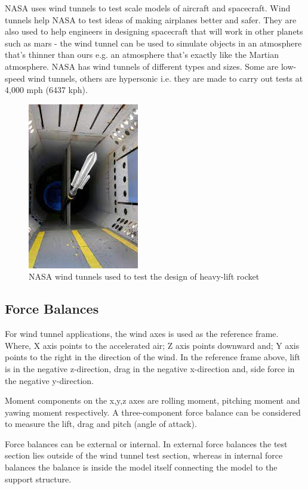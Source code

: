 NASA uses wind tunnels to test scale models of aircraft and spacecraft. Wind tunnels help NASA to test ideas of making airplanes better and safer. They are also used to help engineers in designing spacecraft that will work in other planets such as mars - the wind tunnel can be used to simulate objects in an atmosphere that's thinner than ours e.g. an atmosphere that's exactly like the Martian atmosphere. NASA has wind tunnels of different types and sizes. Some are low-speed wind tunnels, others are hypersonic i.e. they are made to carry out tests at 4,000 mph (6437 kph).
\begin{center}
    \begin{figure}[!h]
\centering
\includegraphics{Figures/Fig4}
\caption{NASA wind tunnels used to test the design of heavy-lift rocket}
\end{figure}
\end{center}
\subsection{Force Balances}
For wind tunnel applications, the wind axes is used as the reference frame. Where, X axis points to the accelerated air; Z axis points downward and; Y axis points to the right in the direction of the wind. In the reference frame above, lift is in the negative z-direction, drag in the negative x-direction and, side force in the negative y-direction.

Moment components on the x,y,z axes are rolling moment, pitching moment and yawing moment respectively. A three-component force balance can be considered to measure the lift, drag and pitch (angle of attack).

Force balances can be external or internal. In external force balances the test section lies outside of the wind tunnel test section, whereas in internal force balances the balance is inside the model itself connecting the model to the support structure.

